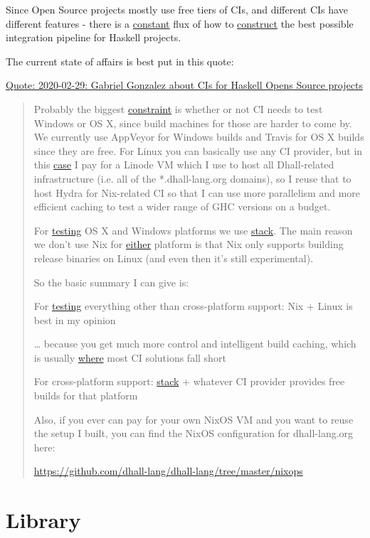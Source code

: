 \documentclass[a4paper,14pt,oneside]{book}
\begin{document}
Since Open Source projects mostly use free tiers of CIs, and different CIs have different features - there is a \hyperref[orgd7109cb]{constant} flux of how to \hyperref[org89c8fd7]{construct} the best possible integration pipeline for Haskell projects.

The current state of affairs is best put in this quote:
\caption{\href{https://github.com/dhall-lang/dhall-haskell/issues/1678#issuecomment-592960057}{Quote: 2020-02-29: Gabriel Gonzalez about CIs for Haskell Opens Source projects}}
\label{quote--gonzales-ci}
\begin{quote}
Probably the biggest \hyperref[org4f4d80f]{constraint} is whether or not CI needs to test Windows or OS X, since build machines for those are harder to come by. We currently use AppVeyor for Windows builds and Travis for OS X builds since they are free. For Linux you can basically use any CI provider, but in this \hyperref[orgda48755]{case} I pay for a Linode VM which I use to host all Dhall-related infrastructure (i.e. all of the *.dhall-lang.org domains), so I reuse that to host Hydra for Nix-related CI so that I can use more parallelism and more efficient caching to test a wider range of GHC versions on a budget.

For \hyperref[orgea1c20b]{testing} OS X and Windows platforms we use \hyperref[org8132915]{stack}. The main reason we don't use Nix for \hyperref[org2270ae2]{either} platform is that Nix only supports building release binaries on Linux (and even then it's still experimental).

So the basic summary I can give is:

For \hyperref[orgea1c20b]{testing} everything other than cross-platform support: Nix + Linux is best in my opinion

\ldots{} because you get much more control and intelligent build caching, which is usually \hyperref[orgb660a1e]{where} most CI solutions fall short

For cross-platform support: \hyperref[org8132915]{stack} + whatever CI provider provides free builds for that platform

Also, if you ever can pay for your own NixOS VM and you want to reuse the setup I built, you can find the NixOS configuration for dhall-lang.org here:

\url{https://github.com/dhall-lang/dhall-lang/tree/master/nixops}
\end{quote}

\part{Library}
\label{sec:org3901dec}
\end{document}
